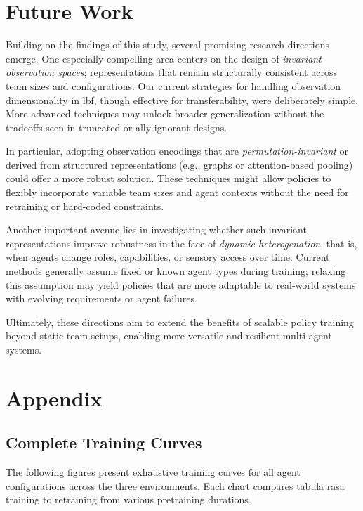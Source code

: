 \documentclass{article}
\begin{document}
\section{Future Work}

Building on the findings of this study, several promising research directions emerge. 
One especially compelling area centers on the design of \emph{invariant observation spaces};
representations that remain structurally consistent across team sizes and configurations. 
Our current strategies for handling observation dimensionality in \gls{lbf}, 
though effective for transferability, were deliberately simple. More advanced techniques may 
unlock broader generalization without the tradeoffs seen in truncated or ally-ignorant designs.

In particular, adopting observation encodings that are \emph{permutation-invariant} or derived 
from structured representations (e.g., graphs or attention-based pooling) 
could offer a more robust solution. These techniques might allow policies to flexibly 
incorporate variable team sizes and agent contexts without the need for retraining or 
hard-coded constraints.

Another important avenue lies in investigating whether such invariant representations 
improve robustness in the face of \emph{dynamic heterogenation}, that is, 
when agents change roles, capabilities, or sensory access over time. 
Current methods generally assume fixed or known agent types during training; 
relaxing this assumption may yield policies that are more adaptable to real-world 
systems with evolving requirements or agent failures.

Ultimately, these directions aim to extend the benefits of scalable policy training 
beyond static team setups, enabling more versatile and resilient multi-agent systems.

\printbibliography

\clearpage
\appendix

\section*{Appendix}

\subsection*{Complete Training Curves}
The following figures present exhaustive training curves for all 
agent configurations across the three environments. Each chart compares tabula rasa 
training to retraining from various pretraining durations.
\end{document}
